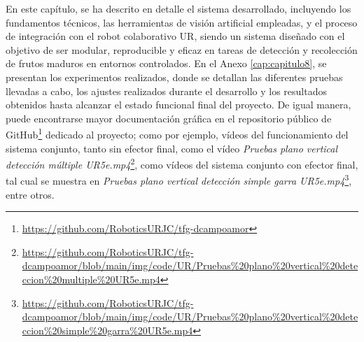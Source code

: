 En este capítulo, se ha descrito en detalle el sistema desarrollado, incluyendo los fundamentos técnicos, las herramientas de visión artificial empleadas, y el proceso de integración con el robot colaborativo UR, siendo un sistema diseñado con el objetivo de ser modular, reproducible y eficaz en tareas de detección y recolección de frutos maduros en entornos controlados. En el Anexo \ref{cap:capitulo8}, se presentan los experimentos realizados, donde se detallan las diferentes pruebas llevadas a cabo, los ajustes realizados durante el desarrollo y los resultados obtenidos hasta alcanzar el estado funcional final del proyecto. De igual manera, puede encontrarse mayor documentación gráfica en el repositorio público de GitHub\footnote{\url{https://github.com/RoboticsURJC/tfg-dcampoamor}} dedicado al proyecto; como por ejemplo, vídeos del funcionamiento del sistema conjunto, tanto sin efector final, como el vídeo \textit{Pruebas plano vertical detección múltiple UR5e.mp4}\footnote{\url{https://github.com/RoboticsURJC/tfg-dcampoamor/blob/main/img/code/UR/Pruebas\%20plano\%20vertical\%20deteccion\%20multiple\%20UR5e.mp4}}, como vídeos del sistema conjunto con efector final, tal cual se muestra en \textit{Pruebas plano vertical detección simple garra UR5e.mp4}\footnote{\url{https://github.com/RoboticsURJC/tfg-dcampoamor/blob/main/img/code/UR/Pruebas\%20plano\%20vertical\%20deteccion\%20simple\%20garra\%20UR5e.mp4}}, entre otros.

















